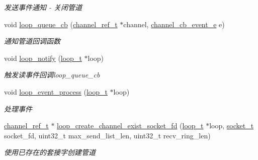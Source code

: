 \begin{DoxyCompactItemize}
\begin{DoxyCompactList}\small\item\em 发送事件通知 -\/ 关闭管道 \end{DoxyCompactList}\item 
void \hyperlink{a00062_a970d2bf2e65270fe3d93de1e22a4d34c_a970d2bf2e65270fe3d93de1e22a4d34c}{loop\+\_\+queue\+\_\+cb} (\hyperlink{a00047_a151271c9d188ef28d4d24bb81dcc1263_a151271c9d188ef28d4d24bb81dcc1263}{channel\+\_\+ref\+\_\+t} $\ast$channel, \hyperlink{a00047_aaf2cba5d4035f3d56350b59342ebf65c_aaf2cba5d4035f3d56350b59342ebf65c}{channel\+\_\+cb\+\_\+event\+\_\+e} e)
\begin{DoxyCompactList}\small\item\em 通知管道回调函数 \end{DoxyCompactList}\item 
void \hyperlink{a00062_a3857990b0f1f9e27e000b5924b88a958_a3857990b0f1f9e27e000b5924b88a958}{loop\+\_\+notify} (\hyperlink{a00047_a9c3ad1cd2de83e09f3a7b59fa82c94ee_a9c3ad1cd2de83e09f3a7b59fa82c94ee}{loop\+\_\+t} $\ast$loop)
\begin{DoxyCompactList}\small\item\em 触发读事件回调loop\+\_\+queue\+\_\+cb \end{DoxyCompactList}\item 
void \hyperlink{a00062_a94a2dfa4ba7723d7face3f76ebf31e54_a94a2dfa4ba7723d7face3f76ebf31e54}{loop\+\_\+event\+\_\+process} (\hyperlink{a00047_a9c3ad1cd2de83e09f3a7b59fa82c94ee_a9c3ad1cd2de83e09f3a7b59fa82c94ee}{loop\+\_\+t} $\ast$loop)
\begin{DoxyCompactList}\small\item\em 处理事件 \end{DoxyCompactList}\item 
\hyperlink{a00047_a151271c9d188ef28d4d24bb81dcc1263_a151271c9d188ef28d4d24bb81dcc1263}{channel\+\_\+ref\+\_\+t} $\ast$ \hyperlink{a00094_ga6879ac453ef83768ce8f8ef43a474409_ga6879ac453ef83768ce8f8ef43a474409}{loop\+\_\+create\+\_\+channel\+\_\+exist\+\_\+socket\+\_\+fd} (\hyperlink{a00047_a9c3ad1cd2de83e09f3a7b59fa82c94ee_a9c3ad1cd2de83e09f3a7b59fa82c94ee}{loop\+\_\+t} $\ast$loop, \hyperlink{a00047_a0d9e0afbf02fb6ed6c5b1415dce51b05_a0d9e0afbf02fb6ed6c5b1415dce51b05}{socket\+\_\+t} socket\+\_\+fd, uint32\+\_\+t max\+\_\+send\+\_\+list\+\_\+len, uint32\+\_\+t recv\+\_\+ring\+\_\+len)
\begin{DoxyCompactList}\small\item\em 使用已存在的套接字创建管道 \end{DoxyCompactList}\item 

\end{DoxyCompactItemize}
